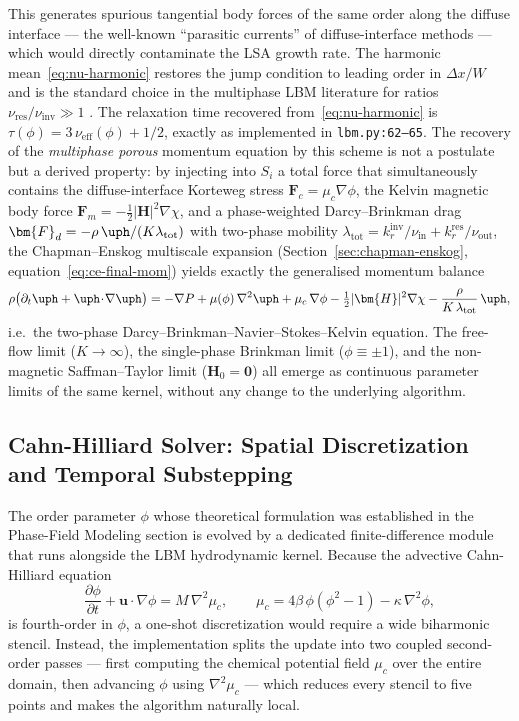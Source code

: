 This generates spurious tangential body forces of the same order along the diffuse interface --- the well-known ``parasitic currents'' of diffuse-interface methods --- which would directly contaminate the LSA growth rate.
The harmonic mean~\eqref{eq:nu-harmonic} restores the jump condition to leading order in $\Delta x/W$ and is the standard choice in the multiphase LBM literature for ratios $\nu_{\mathrm{res}}/\nu_{\mathrm{inv}} \gg 1$ \cite{huang2015multiphaseLBM}.
The relaxation time recovered from~\eqref{eq:nu-harmonic} is $\tau(\phi) = 3\,\nu_{\mathrm{eff}}(\phi) + 1/2$, exactly as implemented in \texttt{lbm.py:62--65}.
The recovery of the \emph{multiphase porous} momentum equation by this scheme is not a postulate but a derived property: by injecting into $S_i$ a total force that simultaneously contains the diffuse-interface Korteweg stress $\bm{F}_c = \mu_c \nabla \phi$, the Kelvin magnetic body force $\bm{F}_m = -\tfrac{1}{2}|\bm{H}|^{2}\nabla\chi$, and a phase-weighted Darcy--Brinkman drag $\bm{F}_d = -\rho\,\uph/(K\lambda_{\mathrm{tot}})$ with two-phase mobility $\lambda_{\mathrm{tot}} = k_r^{\mathrm{inv}}/\nu_{\mathrm{in}} + k_r^{\mathrm{res}}/\nu_{\mathrm{out}}$, the Chapman--Enskog multiscale expansion (Section~\ref{sec:chapman-enskog}, equation~\eqref{eq:ce-final-mom}) yields exactly the generalised momentum balance
\begin{equation*}
\rho\bigl(\partial_t \uph + \uph\!\cdot\!\nabla\uph\bigr) = -\nabla P + \mu(\phi)\,\nabla^{2}\uph + \mu_c\,\nabla\phi - \tfrac{1}{2}|\bm{H}|^{2}\nabla\chi - \frac{\rho}{K\,\lambda_{\mathrm{tot}}}\,\uph,
\end{equation*}
i.e.\ the two-phase Darcy--Brinkman--Navier--Stokes--Kelvin equation.
The free-flow limit ($K\to\infty$), the single-phase Brinkman limit ($\phi \equiv \pm 1$), and the non-magnetic Saffman--Taylor limit ($\bm{H}_0 = \bm{0}$) all emerge as continuous parameter limits of the same kernel, without any change to the underlying algorithm.

\subsection{Cahn-Hilliard Solver: Spatial Discretization and Temporal Substepping}

The order parameter $\phi$ whose theoretical formulation was established in the Phase-Field Modeling section is evolved by a dedicated finite-difference module that runs alongside the LBM hydrodynamic kernel.
Because the advective Cahn-Hilliard equation
\begin{equation}
    \frac{\partial \phi}{\partial t} + \mathbf{u} \cdot \nabla \phi = M\,\nabla^2 \mu_c, \qquad \mu_c = 4\beta\,\phi(\phi^2 - 1) - \kappa\,\nabla^2 \phi,
\end{equation}
is fourth-order in $\phi$, a one-shot discretization would require a wide biharmonic stencil.
Instead, the implementation splits the update into two coupled second-order passes --- first computing the chemical potential field $\mu_c$ over the entire domain, then advancing $\phi$ using $\nabla^2 \mu_c$ --- which reduces every stencil to five points and makes the algorithm naturally local.

